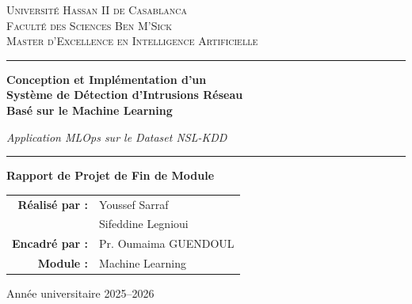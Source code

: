 \documentclass[12pt,a4paper]{report}
\begin{document}
\begin{titlepage}
    \centering
    \vspace*{1cm}


    {\large\textsc{Université Hassan II de Casablanca}\\[0.3cm]}
    {\large\textsc{Faculté des Sciences Ben M'Sick}\\[0.3cm]}
    {\large\textsc{Master d'Excellence en Intelligence Artificielle}\\[0.3cm]}

    \vspace{0.8cm}

    \rule{\textwidth}{0.5pt}
    \vspace{0.8cm}
    {\LARGE\bfseries Conception et Implémentation d'un\\Système de Détection d'Intrusions Réseau\\Basé sur le Machine Learning\par}
    \vspace{0.5cm}
    {\large\itshape Application MLOps sur le Dataset NSL-KDD\par}
    \vspace{0.3cm}
    \rule{\textwidth}{0.5pt}

    \vspace{2cm}

    {\large\textbf{Rapport de Projet de Fin de Module}\par}

    \vspace{1.5cm}

    \begin{tabular}{rl}
        \textbf{Réalisé par :} & Youssef Sarraf \\[0.15cm]
        & Sifeddine Legnioui \\[0.3cm]
        \textbf{Encadré par :} & Pr. Oumaima GUENDOUL \\[0.3cm]
        \textbf{Module :} & Machine Learning \\
    \end{tabular}

    \vfill

    {\large Année universitaire 2025--2026\par}
\end{titlepage}
\end{document}
